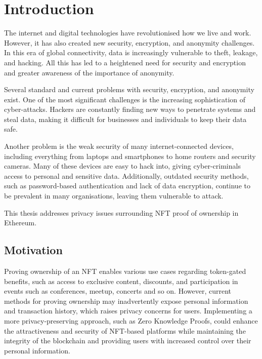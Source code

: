 \chapter{Introduction}
The internet and digital technologies have revolutionised how we live and work. However, it has also created new security, encryption, and anonymity challenges. In this era of global connectivity, data is increasingly vulnerable to theft, leakage, and hacking. All this has led to a heightened need for security and encryption and greater awareness of the importance of anonymity.

Several standard and current problems with security, encryption, and anonymity exist. One of the most significant challenges is the increasing sophistication of cyber-attacks. Hackers are constantly finding new ways to penetrate systems and steal data, making it difficult for businesses and individuals to keep their data safe.

Another problem is the weak security of many internet-connected devices, including everything from laptops and smartphones to home routers and security cameras. Many of these devices are easy to hack into, giving cyber-criminals access to personal and sensitive data. Additionally, outdated security methods, such as password-based authentication and lack of data encryption, continue to be prevalent in many organisations, leaving them vulnerable to attack.

This thesis addresses privacy issues surrounding \ac{NFT} proof of ownership in Ethereum.

\section{Motivation}
Proving ownership of an \ac{NFT} enables various use cases regarding token-gated benefits, such as access to exclusive content, discounts, and participation in events such as conferences, meetup, concerts and so on. However, current methods for proving ownership may inadvertently expose personal information and transaction history, which raises privacy concerns for users. Implementing a more privacy-preserving approach, such as Zero Knowledge Proofs, could enhance the attractiveness and security of \ac{NFT}-based platforms while maintaining the integrity of the blockchain and providing users with increased control over their personal information.

